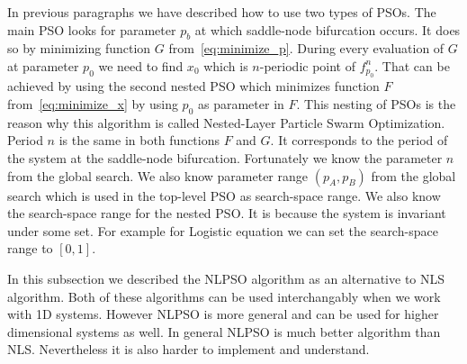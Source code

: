 \par
In previous paragraphs we have described how to use two types of PSOs. 
The main PSO looks for parameter $p_b$ at which saddle-node bifurcation occurs.
It does so by minimizing function $G$ from~\ref{eq:minimize_p}.
During every evaluation of $G$ at parameter $p_0$ we need to find $x_0$ which is $n$-periodic point of $f^{n}_{p_0}$.
That can be achieved by using the second nested PSO which minimizes function $F$ from~\ref{eq:minimize_x} by using $p_0$ as parameter in $F$.
This nesting of PSOs is the reason why this algorithm is called Nested-Layer Particle Swarm Optimization.
Period $n$ is the same in both functions $F$ and $G$.
It corresponds to the period of the system at the saddle-node bifurcation.
Fortunately we know the parameter $n$ from the global search.
We also know parameter range $(p_A, p_B)$ from the global search which is used in the top-level PSO as search-space range.
We also know the search-space range for the nested PSO.
It is because the system is invariant under some set.
For example for Logistic equation we can set the search-space range to $[0, 1]$.
\par
In this subsection we described the NLPSO algorithm as an alternative to NLS algorithm.
Both of these algorithms can be used interchangably when we work with 1D systems.
However NLPSO is more general and can be used for higher dimensional systems as well.
In general NLPSO is much better algorithm than NLS.
Nevertheless it is also harder to implement and understand.



